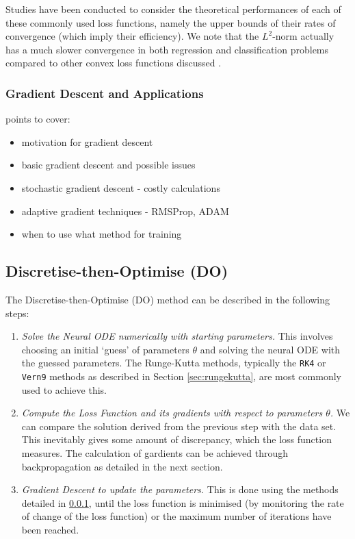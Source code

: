 \documentclass[a4paper,11pt,titlepage]{article}
\theoremstyle{definition}
\theoremstyle{plain}
\theoremstyle{remark}
\begin{document}
Studies have been conducted to consider the theoretical performances of each of these commonly used loss functions, namely the upper bounds of their rates of convergence (which imply their efficiency). We note that the $L^2$-norm actually has a much slower convergence in both regression and classification problems compared to other convex loss functions discussed \cite{Rosasco2004}.

\subsubsection{Gradient Descent and Applications}
\label{sec:gd}

points to cover:
\begin{itemize}
    \item motivation for gradient descent
    \item basic gradient descent and possible issues
    \item stochastic gradient descent - costly calculations
    \item adaptive gradient techniques - RMSProp, ADAM
    \item when to use what method for training
\end{itemize}

\subsection{Discretise-then-Optimise (DO)}
\label{sec:do}

The Discretise-then-Optimise (DO) method can be described in the following steps:
\begin{enumerate}
    \item \textit{Solve the Neural ODE numerically with starting parameters.} This involves choosing an initial ‘guess’ of parameters $\theta$ and solving the neural ODE with the guessed parameters. The Runge-Kutta methods, typically the \texttt{RK4} or \texttt{Vern9} methods as described in Section \ref{sec:rungekutta}, are most commonly used to achieve this.
    \item \textit{Compute the Loss Function and its gradients with respect to parameters $\theta$.} We can compare the solution derived from the previous step with the data set. This inevitably gives some amount of discrepancy, which the loss function measures. The calculation of gardients can be achieved through backpropagation as detailed in the next section.
    \item \textit{Gradient Descent to update the parameters.} This is done using the methods detailed in \ref{sec:gd}, until the loss function is minimised (by monitoring the rate of change of the loss function) or the maximum number of iterations have been reached.
\end{enumerate}
\end{document}
